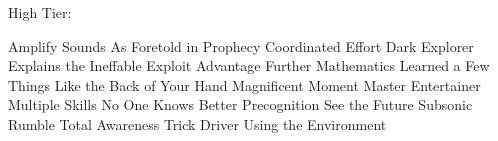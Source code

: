 High Tier:

Amplify Sounds
As Foretold in Prophecy
Coordinated Effort
Dark Explorer
Explains the Ineffable
Exploit Advantage
Further Mathematics
Learned a Few Things
Like the Back of Your Hand
Magnificent Moment
Master Entertainer
Multiple Skills
No One Knows Better
Precognition
See the Future
Subsonic Rumble
Total Awareness
Trick Driver
Using the Environment